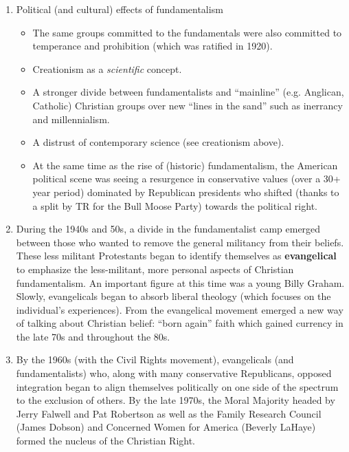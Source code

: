 \documentclass[11pt]{article}
\begin{document}
\begin{enumerate}
	\item Political (and cultural) effects of fundamentalism
		\begin{itemize}
			\item The same groups committed to the fundamentals were also committed to temperance and prohibition (which was ratified in 1920).
			\item Creationism as a \emph{scientific} concept.
			\item A stronger divide between fundamentalists and \enquote{mainline} (e.g. Anglican, Catholic) Christian groups over new \enquote{lines in the sand} such as inerrancy and millennialism.
			\item A distrust of contemporary science (see creationism above).
			\item At the same time as the rise of (historic) fundamentalism, the American political scene was seeing a resurgence in conservative values (over a 30+ year period) dominated by Republican presidents who shifted (thanks to a split by TR for the Bull Moose Party) towards the political right.
		\end{itemize}

	\item During the 1940s and 50s, a divide in the fundamentalist camp emerged between those who wanted to remove the general militancy from their beliefs. These less militant Protestants began to identify themselves as \textbf{evangelical} to emphasize the less-militant, more personal aspects of Christian fundamentalism. An important figure at this time was a young Billy Graham. Slowly, evangelicals began to absorb liberal theology (which focuses on the individual's experiences). From the evangelical movement emerged a new way of talking about Christian belief: \enquote{born again} faith which gained currency in the late 70s and throughout the 80s.

	\item By the 1960s (with the Civil Rights movement), evangelicals (and fundamentalists) who, along with many conservative Republicans, opposed integration began to align themselves politically on one side of the spectrum to the exclusion of others. By the late 1970s, the Moral Majority headed by Jerry Falwell and Pat Robertson as well as the Family Research Council (James Dobson) and Concerned Women for America (Beverly LaHaye) formed the nucleus of the Christian Right.


\end{enumerate}
\end{document}
